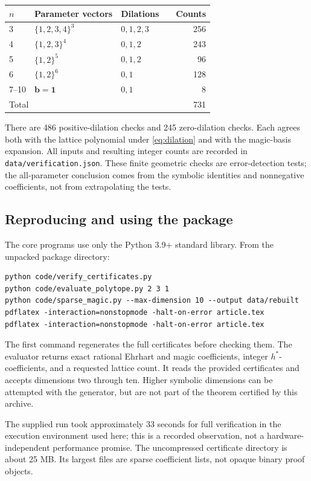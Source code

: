 \documentclass[11pt]{article}
\theoremstyle{definition}
\newcommand{\bb}{\mathbf b}
\newcommand{\one}{\mathbf 1}
\numberwithin{equation}{section}
\begin{document}
\begin{center}
\begin{tabular}{@{}llllr@{}}
\toprule
$n$ & Parameter vectors & Dilations & & Counts\\
\midrule
3 & $\{1,2,3,4\}^3$ & $0,1,2,3$ &&256\\
4 & $\{1,2,3\}^4$ & $0,1,2$ &&243\\
5 & $\{1,2\}^5$ & $0,1,2$ &&96\\
6 & $\{1,2\}^6$ & $0,1$ &&128\\
7--10 & $\bb=\one$ & $0,1$ &&8\\
\midrule
\multicolumn{4}{l}{Total} &731\\
\bottomrule
\end{tabular}
\end{center}
There are 486 positive-dilation checks and 245 zero-dilation checks. Each
agrees both with the lattice polynomial under \eqref{eq:dilation} and
with the magic-basis expansion. All inputs and resulting integer counts
are recorded in \texttt{data/verification.json}. These finite geometric
checks are error-detection tests; the all-parameter conclusion comes
from the symbolic identities and nonnegative coefficients, not from
extrapolating the tests.

\subsection{Reproducing and using the package}
The core programs use only the Python 3.9+ standard library. From the
unpacked package directory:
\begin{lstlisting}
python code/verify_certificates.py
python code/evaluate_polytope.py 2 3 1
python code/sparse_magic.py --max-dimension 10 --output data/rebuilt
pdflatex -interaction=nonstopmode -halt-on-error article.tex
pdflatex -interaction=nonstopmode -halt-on-error article.tex
\end{lstlisting}
The first command regenerates the full certificates before checking them.
The evaluator returns exact rational Ehrhart and magic coefficients,
integer $h^*$-coefficients, and a requested lattice count. It reads the
provided certificates and accepts dimensions two through ten. Higher
symbolic dimensions can be attempted with the generator, but are not
part of the theorem certified by this archive.

The supplied run took approximately 33 seconds for full verification in
the execution environment used here; this is a recorded observation,
not a hardware-independent performance promise. The uncompressed
certificate directory is about 25 MB. Its largest files are sparse
coefficient lists, not opaque binary proof objects.
\end{document}
